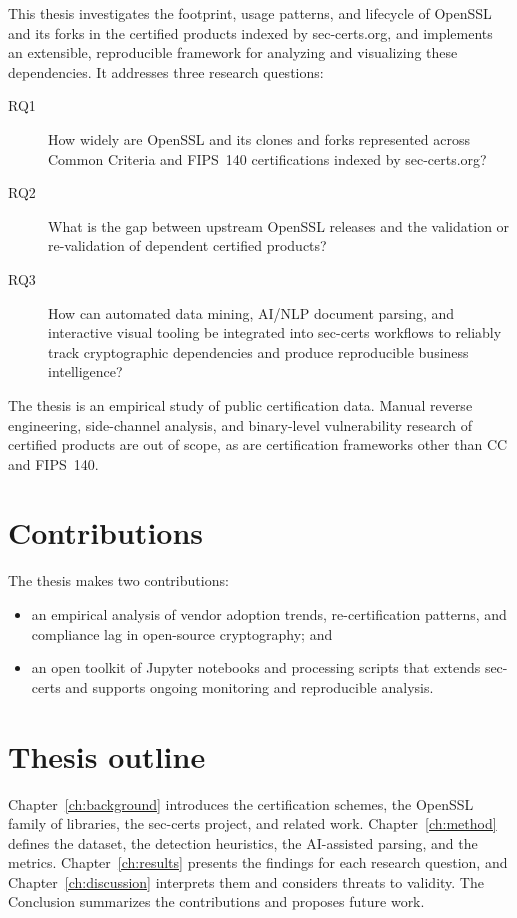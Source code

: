 This thesis investigates the footprint, usage patterns, and lifecycle of
OpenSSL and its forks in the certified products indexed by sec-certs.org,
and implements an extensible, reproducible framework for analyzing and
visualizing these dependencies. It addresses three research questions:

\begin{description}
  \item[RQ1] How widely are OpenSSL and its clones and forks represented
    across Common Criteria and FIPS~140 certifications indexed by
    sec-certs.org?
  \item[RQ2] What is the gap between upstream OpenSSL releases and the
    validation or re-validation of dependent certified products?
  \item[RQ3] How can automated data mining, AI/NLP document parsing, and
    interactive visual tooling be integrated into sec-certs workflows to
    reliably track cryptographic dependencies and produce reproducible
    business intelligence?
\end{description}

The thesis is an empirical study of public certification data. Manual
reverse engineering, side-channel analysis, and binary-level vulnerability
research of certified products are out of scope, as are certification
frameworks other than CC and FIPS~140.

\section*{Contributions}

The thesis makes two contributions:

\begin{itemize}
  \item an empirical analysis of vendor adoption trends, re-certification
    patterns, and compliance lag in open-source cryptography; and
  \item an open toolkit of Jupyter notebooks and processing scripts that
    extends sec-certs and supports ongoing monitoring and reproducible
    analysis.
\end{itemize}

\section*{Thesis outline}

Chapter~\ref{ch:background} introduces the certification schemes, the
OpenSSL family of libraries, the sec-certs project, and related work.
Chapter~\ref{ch:method} defines the dataset, the detection heuristics, the
AI-assisted parsing, and the metrics. Chapter~\ref{ch:results} presents the
findings for each research question, and Chapter~\ref{ch:discussion}
interprets them and considers threats to validity. The Conclusion summarizes
the contributions and proposes future work.
